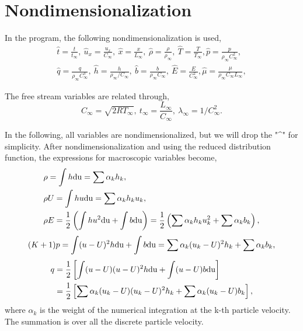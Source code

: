 \documentclass[a4paper]{book}
\begin{document}
\section{Nondimensionalization}
In the program, the following nondimensionalization is used,
\begin{gather*}
    \hat t=\frac{t}{t_\infty},\ \hat u_x=\frac{u_x}{C_\infty},\ \hat x=\frac{x}{L_\infty},\ \hat \rho=\frac{\rho}{\rho_\infty},\ \hat T=\frac{T}{T_\infty}, \hat p=\frac{p}{\rho_\infty C_\infty^2}, \\
    \hat q=\frac{q}{\rho_\infty C_\infty^3},\ \hat h=\frac{h}{\rho_\infty/C_\infty},\ \hat b=\frac{b}{\rho_\infty C_\infty},\ \hat E=\frac{E}{C_\infty^2}, \hat\mu = \frac{\mu}{\rho_\infty C_\infty L_\infty},
\end{gather*}

The free stream variables are related through,
$$C_\infty=\sqrt{2RT_\infty},\ t_\infty=\frac{L_\infty}{C_\infty},\ \lambda_\infty=1/C_\infty^2.$$

In the following, all variables are nondimensionalized, but we will drop the "\textasciicircum" for simplicity. After nondimensionalization and using the reduced distribution function, the expressions for macroscopic variables become,
\begin{equation} 
    \label{eq:conserved_var}
    \begin{aligned}
        &\rho=\int h{\rm du}=\sum\alpha_k h_k,\\
        &\rho U=\int hu{\rm du}=\sum\alpha_k h_k u_k,\\
        &\rho E=\frac{1}{2}\left(\int hu^2{\rm du}+\int b{\rm du}\right)=\frac{1}{2}\left(\sum\alpha_k h_k u_k^2+\sum\alpha_k b_k\right),
    \end{aligned}
\end{equation}
\begin{equation} 
    (K+1)p=\int(u-U)^2h{\rm du}+\int b{\rm du}=\sum\alpha_k(u_k-U)^2 h_k+\sum\alpha_k b_k,
\end{equation}
\begin{equation} 
    \label{eq:heatflux}
    \begin{aligned}
        q&=\frac{1}{2}\left[\int(u-U)(u-U)^2h{\rm du}+\int(u-U)b{\rm du}\right]\\
         &=\frac{1}{2}\left[\sum\alpha_k (u_k-U)(u_k-U)^2 h_k+\sum\alpha_k (u_k-U)b_k\right],
    \end{aligned}
\end{equation}
where $\alpha_k$ is the weight of the numerical integration at the k-th particle velocity. The summation is over all the discrete particle velocity.
\end{document}
